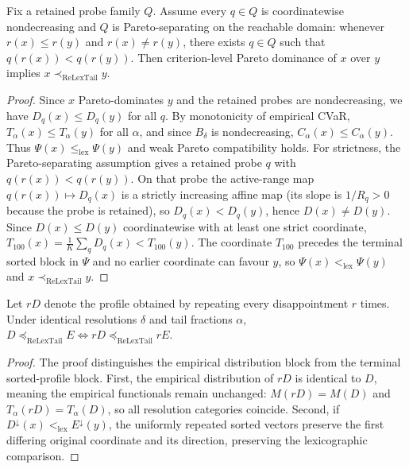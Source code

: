 \begin{theorem}
Fix a retained probe family $Q$. Assume every $q\in Q$ is coordinatewise nondecreasing and $Q$ is Pareto-separating on the reachable domain: whenever $r(x)\le r(y)$ and $r(x)\ne r(y)$, there exists $q\in Q$ such that $q(r(x))<q(r(y))$. Then criterion-level Pareto dominance of $x$ over $y$ implies $x\prec_{\mathrm{ReLexTail}}y$.
\end{theorem}
\begin{proof}
Since $x$ Pareto-dominates $y$ and the retained probes are nondecreasing, we have $D_q(x) \leq D_q(y)$ for all $q$. By monotonicity of empirical CVaR, $T_\alpha(x) \leq T_\alpha(y)$ for all $\alpha$, and since $B_\delta$ is nondecreasing, $C_\alpha(x) \leq C_\alpha(y)$. Thus $\Psi(x) \leq_{\mathrm{lex}} \Psi(y)$ and weak Pareto compatibility holds. For strictness, the Pareto-separating assumption gives a retained probe $q$ with $q(r(x))<q(r(y))$. On that probe the active-range map $q(r(x)) \mapsto D_q(x)$ is a strictly increasing affine map (its slope is $1/R_q > 0$ because the probe is retained), so $D_q(x) < D_q(y)$, hence $D(x) \neq D(y)$. Since $D(x) \leq D(y)$ coordinatewise with at least one strict coordinate, $T_{100}(x) = \frac{1}{K}\sum_q D_q(x) < T_{100}(y)$. The coordinate $T_{100}$ precedes the terminal sorted block in $\Psi$ and no earlier coordinate can favour $y$, so $\Psi(x) <_{\mathrm{lex}} \Psi(y)$ and $x \prec_{\mathrm{ReLexTail}} y$.
\end{proof}

\begin{theorem}
Let $rD$ denote the profile obtained by repeating every disappointment $r$ times. Under identical resolutions $\delta$ and tail fractions $\alpha$, $D \preceq_{\mathrm{ReLexTail}} E \iff rD \preceq_{\mathrm{ReLexTail}} rE$.
\end{theorem}
\begin{proof}
The proof distinguishes the empirical distribution block from the terminal sorted-profile block. First, the empirical distribution of $rD$ is identical to $D$, meaning the empirical functionals remain unchanged: $M(rD) = M(D)$ and $T_\alpha(rD) = T_\alpha(D)$, so all resolution categories coincide. Second, if $D^\downarrow(x) <_{\mathrm{lex}} E^\downarrow(y)$, the uniformly repeated sorted vectors preserve the first differing original coordinate and its direction, preserving the lexicographic comparison.
\end{proof}

